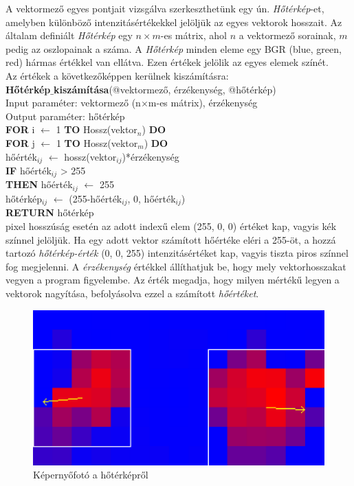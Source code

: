 
A vektormező egyes pontjait vizsgálva szerkeszthetünk egy ún. \textit{Hőtérkép}-et, amelyben különböző intenzitásértékekkel jelöljük az egyes vektorok hosszait. Az általam definiált \textit{Hőtérkép} egy $n \times m$-es mátrix, ahol $n$ a vektormező sorainak, $m$ pedig az oszlopainak a száma. A \textit{Hőtérkép} minden eleme egy BGR (blue, green, red) hármas értékkel van ellátva. Ezen értékek jelölik az egyes elemek színét.\\
Az értékek a következőképpen kerülnek kiszámításra:\\
\newline
\noindent \textbf{Hőtérkép$\_$kiszámítása}(@vektormező, érzékenység, @hőtérkép)\\ 
Input paraméter: vektormező (n$\times$m-es mátrix), érzékenység\\
Output paraméter: hőtérkép\\
\textbf{FOR} i $\leftarrow$ 1 \textbf{TO} Hossz(vektor$_n$) \textbf{DO}\\
\indent \textbf{FOR} j $\leftarrow$ 1 \textbf{TO} Hossz(vektor$_m$) \textbf{DO}\\
\indent \indent hőérték$_{ij}$ $\leftarrow$ hossz(vektor$_{ij}$)*érzékenység\\
\indent \indent \textbf{IF} hőérték$_{ij}$ > 255\\
\indent \indent \indent \textbf{THEN} hőérték$_{ij}$ $\leftarrow$ 255\\
\indent \indent hőtérkép$_{ij}$ $\leftarrow$ (255-hőérték$_{ij}$, 0, hőérték$_{ij}$)\\
\textbf{RETURN} hőtérkép\\
 pixel hosszúság esetén az adott indexű elem (255, 0, 0) értéket kap, vagyis kék színnel jelöljük. Ha egy adott vektor számított hőértéke eléri a 255-öt, a hozzá tartozó \textit{hőtérkép-érték} (0, 0, 255) intenzitásértéket kap, vagyis tiszta piros színnel fog megjelenni.
A \textit{érzékenység} értékkel állíthatjuk be, hogy mely vektorhosszakat vegyen a program figyelembe. Az érték megadja, hogy milyen mértékű legyen a vektorok nagyítása, befolyásolva ezzel a számított \textit{hőértéket}.
\begin{figure}[h]
\centering
\includegraphics[width=11.2truecm, height=6.3truecm]{images/HeatMap_screenshot.png}
\caption{Képernyőfotó a hőtérképről}
\label{fig:heatmap}
\end{figure}

